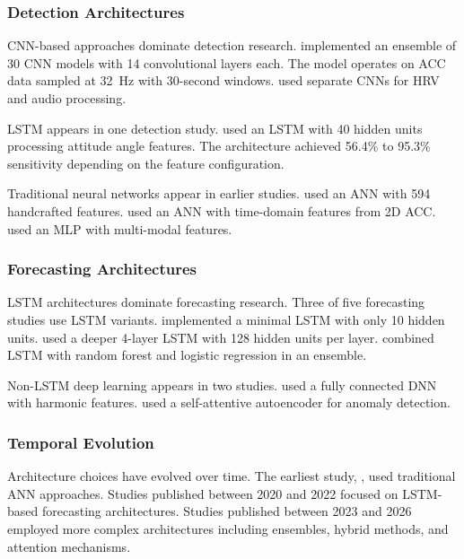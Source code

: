 \subsubsection{Detection Architectures}

CNN-based approaches dominate detection research. \textcite{spahrDeepLearningbasedDetection2025} implemented an ensemble of 30 CNN models with 14 convolutional layers each. The model operates on ACC data sampled at 32~Hz with 30-second windows. \textcite{elemamAutomatedValidatedTool2025} used separate CNNs for HRV and audio processing.

LSTM appears in one detection study. \textcite{wangEpilepticSeizureDetection2025} used an LSTM with 40 hidden units processing attitude angle features. The architecture achieved 56.4\% to 95.3\% sensitivity depending on the feature configuration.

Traditional neural networks appear in earlier studies. \textcite{fineDetectionKeyAutomated2025} used an ANN with 594 handcrafted features. \textcite{borujenyDetectionEpilepticSeizure2013} used an ANN with time-domain features from 2D ACC. \textcite{singhrathoreDevelopmentMultimodalMachine2024} used an MLP with multi-modal features.

\subsubsection{Forecasting Architectures}

LSTM architectures dominate forecasting research. Three of five forecasting studies use LSTM variants. \textcite{meiselMachineLearningWristband2020} implemented a minimal LSTM with only 10 hidden units. \textcite{nasseriAmbulatorySeizureForecasting2021} used a deeper 4-layer LSTM with 128 hidden units per layer. \textcite{stirlingForecastingSeizureLikelihood2021} combined LSTM with random forest and logistic regression in an ensemble.

Non-LSTM deep learning appears in two studies. \textcite{vielufSeizureMonitoringCombined2025} used a fully connected DNN with harmonic features. \textcite{odeDevelopmentEpilepticSeizure2023} used a self-attentive autoencoder for anomaly detection.

\subsubsection{Temporal Evolution}

Architecture choices have evolved over time. The earliest study, \textcite{borujenyDetectionEpilepticSeizure2013}, used traditional ANN approaches. Studies published between 2020 and 2022 focused on LSTM-based forecasting architectures. Studies published between 2023 and 2026 employed more complex architectures including ensembles, hybrid methods, and attention mechanisms.

